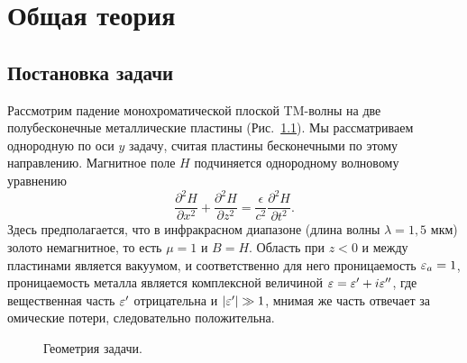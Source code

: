 \chapter{Общая теория}
\section{Постановка задачи}
 

 Рассмотрим падение монохроматической плоской TM-волны на две полубесконечные металлические пластины (Рис.~\ref{fig:geom}). Мы рассматриваем однородную по оси  $y$ задачу, считая пластины бесконечными по этому направлению.
 Магнитное поле $H$ подчиняется однородному волновому уравнению 
 \begin{equation}
   \frac{\partial^2 H}{\partial x^2} +   \frac{\partial^2 H}{\partial z^2} = \frac{\epsilon}{c^2}\frac{\partial^2 H}{\partial t^2}.
 \end{equation}
 Здесь предполагается, что в инфракрасном диапазоне (длина волны $\lambda = 1,5$ мкм) золото немагнитное, то есть $\mu = 1$ и $B = H$. Область при $z<0$ 
 и между пластинами является вакуумом, и соответственно для него проницаемость $\varepsilon_a = 1$, проницаемость металла является
 комплексной величиной $\varepsilon = \varepsilon' + i \varepsilon''$, где вещественная часть $\varepsilon'$ отрицательна и $\lvert\varepsilon'\rvert \gg 1$, мнимая же часть 
 отвечает за омические потери, следовательно положительна. 
\begin{figure}
\begin{center}
    
\end{center}
\caption{Геометрия задачи.}
\label{fig:geom}
\end{figure}

